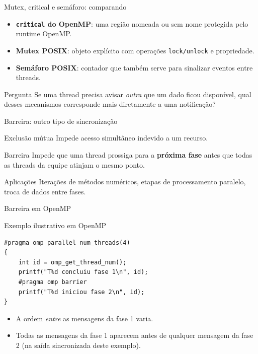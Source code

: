 \documentclass[aspectratio=169,11pt]{beamer}
\begin{document}
\begin{frame}{Mutex, critical e semáforo: comparando}
\small
\begin{itemize}
\item \textbf{\texttt{critical} do OpenMP}: uma região nomeada ou sem nome protegida pelo runtime OpenMP.
\item \textbf{Mutex POSIX}: objeto explícito com operações \texttt{lock/unlock} e propriedade.
\item \textbf{Semáforo POSIX}: contador que também serve para sinalizar eventos entre threads.
\end{itemize}
\begin{block}{Pergunta}
Se uma thread precisa avisar \emph{outra} que um dado ficou disponível, qual desses mecanismos corresponde mais diretamente a uma notificação?
\end{block}
\end{frame}

\begin{frame}{Barreira: outro tipo de sincronização}
\small
\begin{block}{Exclusão mútua}
Impede acesso simultâneo indevido a um recurso.
\end{block}
\begin{block}{Barreira}
Impede que uma thread prossiga para a \textbf{próxima fase} antes que todas as threads da equipe atinjam o mesmo ponto.
\end{block}
\begin{exampleblock}{Aplicações}
Iterações de métodos numéricos, etapas de processamento paralelo, troca de dados entre fases.
\end{exampleblock}
\end{frame}

\begin{frame}[fragile]{Barreira em OpenMP}
\small
\begin{block}{Exemplo ilustrativo em OpenMP}
\begin{verbatim}
#pragma omp parallel num_threads(4)
{
    int id = omp_get_thread_num();
    printf("T%d concluiu fase 1\n", id);
    #pragma omp barrier
    printf("T%d iniciou fase 2\n", id);
}
\end{verbatim}
\end{block}
\begin{itemize}
\item A ordem \emph{entre} as mensagens da fase 1 varia.
\item Todas as mensagens da fase 1 aparecem antes de qualquer mensagem da fase 2 (na saída sincronizada deste exemplo).
\end{itemize}
\end{frame}
\end{document}
